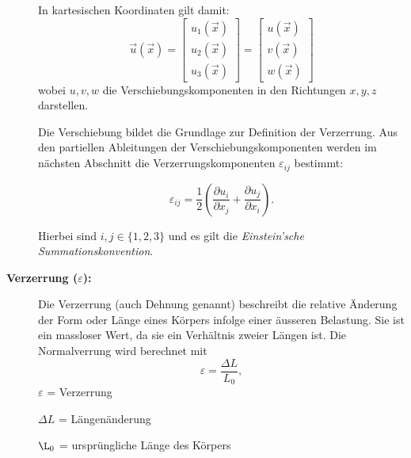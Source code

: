 \begin{description}
In kartesischen Koordinaten gilt damit:
\[
\vec{u}(\vec{x}) =
\begin{bmatrix}
	u_1(\vec{x}) \\
	u_2(\vec{x}) \\
	u_3(\vec{x})
\end{bmatrix}
=
\begin{bmatrix}
	u(\vec{x}) \\
	v(\vec{x}) \\
	w(\vec{x})
\end{bmatrix}
\]
wobei $u, v, w$ die Verschiebungskomponenten in den Richtungen $x, y, z$ darstellen.

Die Verschiebung bildet die Grundlage zur Definition der Verzerrung. 
Aus den partiellen Ableitungen der Verschiebungskomponenten werden im nächsten Abschnitt die Verzerrungskomponenten $\varepsilon_{ij}$ bestimmt:

\begin{equation}
	\varepsilon_{ij} = \frac{1}{2}
	\left(
	\frac{\partial u_i}{\partial x_j}
	+
	\frac{\partial u_j}{\partial x_i}
	\right).
\end{equation}

Hierbei sind $i,j \in \{1,2,3\}$ und es gilt die \emph{Einstein’sche Summationskonvention}.

\item[\textbf{Verzerrung ($\varepsilon$):}] Die Verzerrung (auch Dehnung genannt) beschreibt die relative Änderung der Form oder Länge eines Körpers infolge einer äusseren Belastung. 
Sie ist ein massloser Wert, da sie ein Verhältnis zweier Längen ist.
Die Normalverrung wird berechnet mit
	\begin{equation}
		\varepsilon 
		= \frac{\Delta L}{L_0},
	\end{equation}
	$\varepsilon$ = Verzerrung
	
	$\Delta L$ = Längenänderung
	
	$\L_0$ = ursprüngliche Länge des Körpers
	

\end{description}
